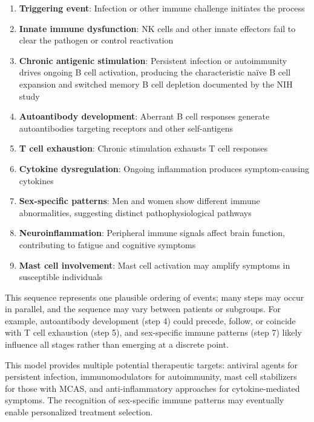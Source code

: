 \begin{enumerate}
    \item \textbf{Triggering event}: Infection or other immune challenge initiates the process

    \item \textbf{Innate immune dysfunction}: NK cells and other innate effectors fail to clear the pathogen or control reactivation

    \item \textbf{Chronic antigenic stimulation}: Persistent infection or autoimmunity drives ongoing B cell activation, producing the characteristic naïve B cell expansion and switched memory B cell depletion documented by the NIH study

    \item \textbf{Autoantibody development}: Aberrant B cell responses generate autoantibodies targeting receptors and other self-antigens

    \item \textbf{T cell exhaustion}: Chronic stimulation exhausts T cell responses

    \item \textbf{Cytokine dysregulation}: Ongoing inflammation produces symptom-causing cytokines

    \item \textbf{Sex-specific patterns}: Men and women show different immune abnormalities, suggesting distinct pathophysiological pathways

    \item \textbf{Neuroinflammation}: Peripheral immune signals affect brain function, contributing to fatigue and cognitive symptoms

    \item \textbf{Mast cell involvement}: Mast cell activation may amplify symptoms in susceptible individuals
\end{enumerate}

This sequence represents one plausible ordering of events; many steps may occur in parallel, and the sequence may vary between patients or subgroups. For example, autoantibody development (step 4) could precede, follow, or coincide with T cell exhaustion (step 5), and sex-specific immune patterns (step 7) likely influence all stages rather than emerging at a discrete point.

This model provides multiple potential therapeutic targets: antiviral agents for persistent infection, immunomodulators for autoimmunity, mast cell stabilizers for those with MCAS, and anti-inflammatory approaches for cytokine-mediated symptoms. The recognition of sex-specific immune patterns may eventually enable personalized treatment selection.


